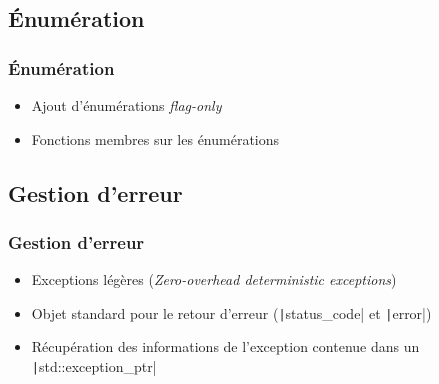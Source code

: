 \documentclass[C++.tex]{subfiles}
\begin{document}
\subsection*{Énumération}
\begin{frame}[fragile]
	\frametitle{Énumération}
	\begin{itemize}
		\item Ajout d'énumérations \og{}\textit{flag-only}\fg{}
		\item Fonctions membres sur les énumérations
	\end{itemize}

\end{frame}

\subsection*{Gestion d'erreur}
\begin{frame}[fragile]
	\frametitle{Gestion d'erreur}
	\begin{itemize}
		\item Exceptions légères (\textit{Zero-overhead deterministic exceptions})
		\item Objet standard pour le retour d'erreur (\texttt|status_code| et \texttt|error|)
		\item Récupération des informations de l'exception contenue dans un \texttt|std::exception_ptr|
	\end{itemize}

\end{frame}
\end{document}

